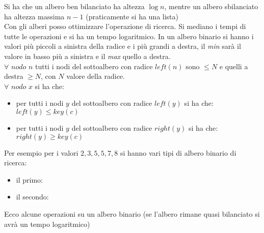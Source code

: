 \documentclass[a4paper,12pt,oneside,tikz]{book}
\begin{document}
Si ha che un albero ben bilanciato ha altezza $\log n$, mentre un albero sbilanciato ha altezza massima $n-1$ (praticamente si ha una lista)\\
Con gli alberi posso ottimizzare l'operazione di ricerca. Si mediano i tempi di tutte le operazioni e si ha un tempo logaritmico. In un albero binario si hanno i valori più piccoli a sinistra della radice e i più grandi a destra, il \textit{min} sarà il valore in basso più a sinistra e il \textit{max} quello a destra.\\ $\forall	\,\, nodo\,\, n$ tutti i nodi del sottoalbero con radice $left(n)$ sono $\leq N$ e quelli a destra $\geq N$, con $N$ valore della radice.\\
$\forall \,\, nodo \,\, x$ si ha che:
\begin{itemize}
\item per tutti i nodi $y$ del sottoalbero con radice $left(y)$ si ha che: $left(y)\leq key(c)$
\item per tutti i nodi $y$ del sottoalbero con radice $right(y)$ si ha che: $right(y)\geq key(c)$
\end{itemize}
Per esempio per i valori $2,3,5,5,7,8$ si hanno vari tipi di albero binario di ricerca:
\begin{itemize}
\item il primo:
\begin{center}
\end{center}
\item il secondo:
\begin{center}
\end{center}
\end{itemize}
Ecco alcune operazioni su un albero binario (se l'albero rimane quasi bilanciato si avrà un tempo logaritmico)
\end{document}

